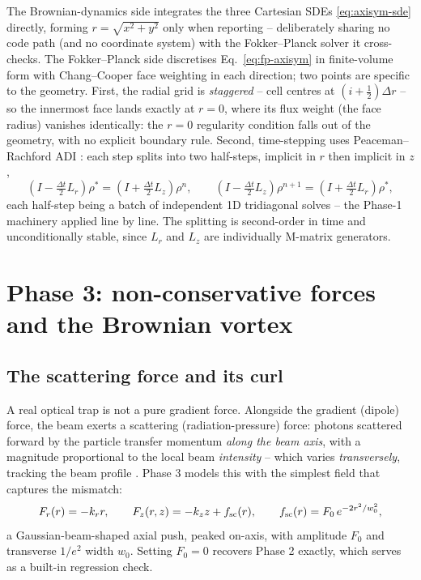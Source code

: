 \documentclass[11pt]{article}
\begin{document}
The Brownian-dynamics side integrates the three Cartesian SDEs \eqref{eq:axisym-sde} directly, forming $r=\sqrt{x^2+y^2}$ only when reporting -- deliberately sharing no code path (and no coordinate system) with the Fokker--Planck solver it cross-checks. The Fokker--Planck side discretises Eq.~\eqref{eq:fp-axisym} in finite-volume form with Chang--Cooper face weighting in each direction; two points are specific to the geometry. First, the radial grid is \emph{staggered} -- cell centres at $(i+\tfrac12)\Delta r$ -- so the innermost face lands exactly at $r=0$, where its flux weight (the face radius) vanishes identically: the $r=0$ regularity condition falls out of the geometry, with no explicit boundary rule. Second, time-stepping uses Peaceman--Rachford ADI \cite{PeacemanRachford1955}: each step splits into two half-steps, implicit in $r$ then implicit in $z$,
\begin{equation}
\left(I - \tfrac{\Delta t}{2}L_r\right)\rho^{*} = \left(I + \tfrac{\Delta t}{2}L_z\right)\rho^{n},
\qquad
\left(I - \tfrac{\Delta t}{2}L_z\right)\rho^{n+1} = \left(I + \tfrac{\Delta t}{2}L_r\right)\rho^{*},
\label{eq:adi}
\end{equation}
each half-step being a batch of independent 1D tridiagonal solves -- the Phase-1 machinery applied line by line. The splitting is second-order in time and unconditionally stable, since $L_r$ and $L_z$ are individually M-matrix generators.

\section{Phase 3: non-conservative forces and the Brownian vortex}
\label{sec:phase3}

\subsection{The scattering force and its curl}

A real optical trap is not a pure gradient force. Alongside the gradient (dipole) force, the beam exerts a scattering (radiation-pressure) force: photons scattered forward by the particle transfer momentum \emph{along the beam axis}, with a magnitude proportional to the local beam \emph{intensity} -- which varies \emph{transversely}, tracking the beam profile \cite{JonesMaragoVolpe2015}. Phase 3 models this with the simplest field that captures the mismatch:
\begin{equation}
F_r(r) = -k_r r, \qquad
F_z(r,z) = -k_z z + f_{\rm sc}(r), \qquad
f_{\rm sc}(r) = F_0\, e^{-2r^2/w_0^2},
\label{eq:nc-force}
\end{equation}
a Gaussian-beam-shaped axial push, peaked on-axis, with amplitude $F_0$ and transverse $1/e^2$ width $w_0$. Setting $F_0=0$ recovers Phase 2 exactly, which serves as a built-in regression check.
\end{document}
